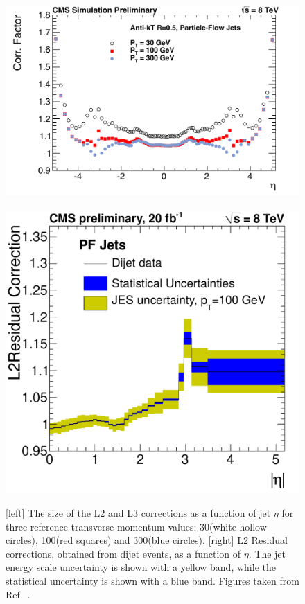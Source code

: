 \begin{figure}[tpb]
  \centering
\includegraphics[height=0.22\textheight]
{figures/eventreco_objects/CorrectionVsEta_Overview_TDR_ak5pfl1_L2L3}
~
\includegraphics[height=0.22\textheight]
  {figures/eventreco_objects/ResComp_FSRcorr_residuals_Abseta_PF_DiJetData}
  \caption{[left] The size of the L2 and L3 corrections as a function of jet $\eta$ for three
reference transverse momentum values: 30\GeV (white hollow circles), 100\GeV (red squares) and
300\GeV (blue circles). 
[right] L2 Residual corrections, obtained from dijet events, as a function of $\eta$. The jet
energy scale uncertainty is shown with a yellow band, while the statistical uncertainty is shown
with a blue band.
Figures taken from Ref.~\cite{JEC_plots2}.
  \label{fig:JEC_L23}}
\end{figure}


